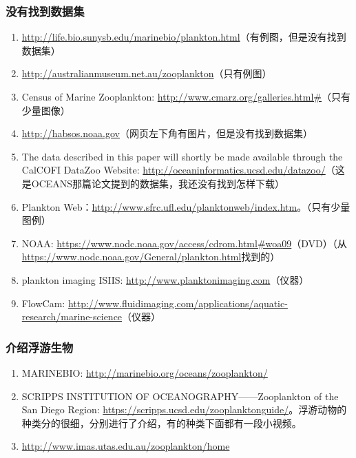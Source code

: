 \subsubsection{没有找到数据集}
\begin{enumerate}
\item \url{http://life.bio.sunysb.edu/marinebio/plankton.html}（有例图，但是没有找到数据集）

\item \url{http://australianmuseum.net.au/zooplankton}（只有例图）

\item Census of Marine Zooplankton: \url{http://www.cmarz.org/galleries.html#}（只有少量图像）

\item \url{http://habsos.noaa.gov}（网页左下角有图片，但是没有找到数据集）

\item The data described in this paper will shortly be made available through the CalCOFI DataZoo Website: \url{http://oceaninformatics.ucsd.edu/datazoo/}（这是OCEANS那篇论文提到的数据集，我还没有找到怎样下载）

\item Plankton Web：\url{http://www.sfrc.ufl.edu/planktonweb/index.htm}。（只有少量图例）

\item NOAA: \url{https://www.nodc.noaa.gov/access/cdrom.html#woa09}（DVD）（从\url{https://www.nodc.noaa.gov/General/plankton.html}找到的）

\item plankton imaging ISIIS: \url{http://www.planktonimaging.com}（仪器）

\item FlowCam: \url{http://www.fluidimaging.com/applications/aquatic-research/marine-science}（仪器）
\end{enumerate}





\subsubsection{介绍浮游生物}
\begin{enumerate}
\item MARINEBIO: \url{http://marinebio.org/oceans/zooplankton/}

\item SCRIPPS INSTITUTION OF OCEANOGRAPHY——Zooplankton of the San Diego Region: \url{https://scripps.ucsd.edu/zooplanktonguide/}。浮游动物的种类分的很细，分别进行了介绍，有的种类下面都有一段小视频。


\item \url{http://www.imas.utas.edu.au/zooplankton/home}
\end{enumerate}



